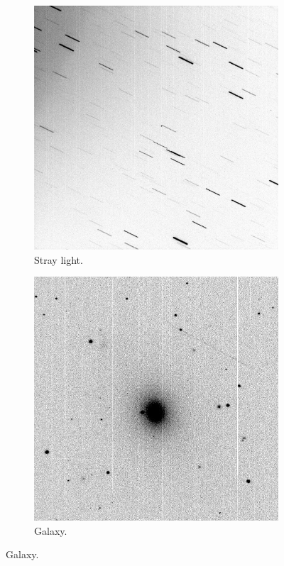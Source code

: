     
    \begin{figure}[!h]
    \centering
        \begin{subfigure}{.3\textwidth}
        \centering
            \includegraphics[width=\textwidth]{images/straylight.png}
            \caption{Stray light.}
            \label{fig:straylight}
        \end{subfigure}
        \begin{subfigure}{.3\textwidth}
            \centering
            \includegraphics[width=\textwidth]{images/galaxyreal.jpg}
            \caption{Galaxy.}
            \label{fig:diffgalaxy}
        \end{subfigure}


\end{figure}
